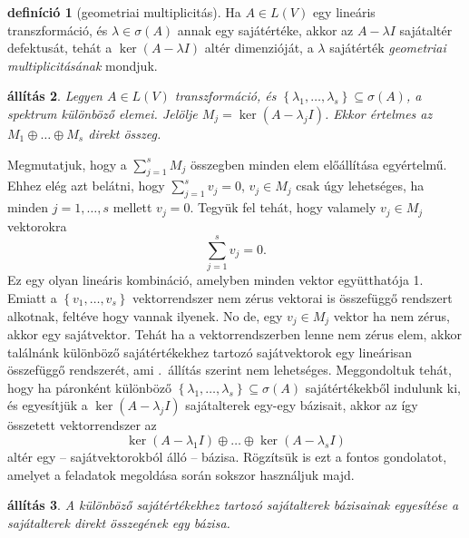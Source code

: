 \documentclass[9pt, a4paper, showtrims]{memoir}
\makeatletter
\renewenvironment{proof}[1][\proofname]
    {\par\pushQED{\qed}%
    \normalfont \topsep6\p@\@plus6\p@\relax
    \trivlist
    \item[\hskip\labelsep
        \itshape
    #1\@addpunct{:}]\ignorespaces}
    {\popQED\endtrivlist\@endpefalse}
\theoremstyle{plain}
\newtheorem{proposition}{állítás}[chapter]
\theoremstyle{remark}
\theoremstyle{definition}
\newtheorem{definition}[proposition]{definíció}
\makeatother
\begin{document}
\begin{definition}[geometriai multiplicitás]
	Ha $A\in L\left( V \right)$ egy lineáris transzformáció,
	és $\lambda\in\sigma\left( A \right)$ annak egy sajátértéke,
	akkor az $A-\lambda I$ sajátaltér defektusát,
	tehát a $\ker\left( A-\lambda I \right)$ altér dimenzióját,
	a $\lambda$ sajátérték \emph{geometriai multiplicitásának}
	mondjuk.
\end{definition}
\begin{proposition}
	Legyen $A\in L\left( V \right)$ transzformáció, és
	$\left\{ \lambda_1,\ldots,\lambda_s \right\}\subseteq\sigma\left( A \right)$,
	a spektrum különböző elemei.
	Jelölje $M_j=\ker\left( A-\lambda_j I \right)$.
	Ekkor értelmes az $M_1\oplus\dots\oplus M_s$ direkt összeg.
\end{proposition}
\begin{proof}
	Megmutatjuk, hogy a $\sum_{j=1}^sM_j$ összegben minden elem előállítása egyértelmű.
	Ehhez elég azt belátni, hogy $\sum_{j=1}^sv_j=0$, $v_j\in M_j$ csak úgy lehetséges, ha
	minden $j=1,\ldots,s$ mellett $v_j=0$.
	Tegyük fel tehát, hogy valamely $v_j\in M_j$ vektorokra
	\[
		\sum_{j=1}^sv_j=0.
	\]
	Ez egy olyan lineáris kombináció, amelyben minden vektor együtthatója 1.
	Emiatt a $\left\{ v_1,\ldots,v_s \right\}$ vektorrendszer nem zérus vektorai is összefüggő rendszert alkotnak,
	feltéve hogy vannak ilyenek.
	No de, egy $v_j\in M_j$ vektor ha nem zérus, akkor egy sajátvektor.
	Tehát ha a vektorrendszerben lenne nem zérus elem,
	akkor találnánk különböző sajátértékekhez tartozó sajátvektorok egy lineárisan összefüggő rendszerét,
	ami .~állítás szerint nem lehetséges.
\end{proof}
Meggondoltuk tehát,
hogy ha páronként különböző $\left\{ \lambda_1,\ldots,\lambda_s \right\}\subseteq\sigma\left( A \right)$ sajátértékekből indulunk ki,
és egyesítjük a $\ker\left( A-\lambda_j I \right)$ sajátalterek egy-egy bázisait,
akkor az így összetett vektorrendszer az
\[
	\ker\left( A-\lambda_1 I \right)\oplus\dots\oplus\ker\left( A-\lambda_s I \right)
\]
altér egy -- sajátvektorokból álló -- bázisa.
Rögzítsük is ezt a fontos gondolatot,
amelyet a feladatok megoldása során sokszor használjuk majd.
\begin{proposition}
	A különböző sajátértékekhez tartozó sajátalterek bázisainak egyesítése a sajátalterek direkt összegének egy bázisa.
\end{proposition}
\end{document}
